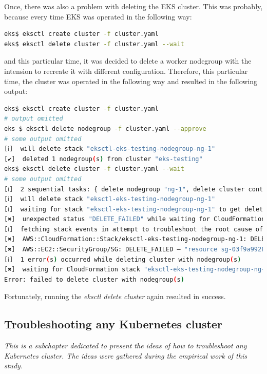 Once, there was also a problem with deleting the EKS cluster. This was probably, because every time EKS was operated in the following way:
\begin{lstlisting}[basicstyle=\tiny,caption={Deleting eksctl cluster},captionpos=b,language=Bash,xleftmargin=1cm]
eks$ eksctl create cluster -f cluster.yaml
eks$ eksctl delete cluster -f cluster.yaml --wait
\end{lstlisting}
and this particular time, it was decided to delete a worker nodegroup with the intension to recreate it with different configuration. Therefore, this particular time, the cluster was operated in the following way and resulted in the following output:
\begin{lstlisting}[basicstyle=\tiny,caption={Eksctl special operations},captionpos=b,language=Bash,xleftmargin=1cm]
eks$ eksctl create cluster -f cluster.yaml
# output omitted
eks $ eksctl delete nodegroup -f cluster.yaml --approve
# some output omitted
[ℹ]  will delete stack "eksctl-eks-testing-nodegroup-ng-1"
[✔]  deleted 1 nodegroup(s) from cluster "eks-testing"
eks$ eksctl delete cluster -f cluster.yaml --wait
# some output omitted
[ℹ]  2 sequential tasks: { delete nodegroup "ng-1", delete cluster control plane "eks-testing" }
[ℹ]  will delete stack "eksctl-eks-testing-nodegroup-ng-1"
[ℹ]  waiting for stack "eksctl-eks-testing-nodegroup-ng-1" to get deleted
[✖]  unexpected status "DELETE_FAILED" while waiting for CloudFormation stack "eksctl-eks-testing-nodegroup-ng-1"
[ℹ]  fetching stack events in attempt to troubleshoot the root cause of the failure
[✖]  AWS::CloudFormation::Stack/eksctl-eks-testing-nodegroup-ng-1: DELETE_FAILED – "The following resource(s) failed to delete: [SG]. "
[✖]  AWS::EC2::SecurityGroup/SG: DELETE_FAILED – "resource sg-03f9a9928f765ecae has a dependent object (Service: AmazonEC2; Status Code: 400; Error Code: DependencyViolation; Request ID: 682fd971-5ec7-472e-9eee-4d52a44f9455)"
[ℹ]  1 error(s) occurred while deleting cluster with nodegroup(s)
[✖]  waiting for CloudFormation stack "eksctl-eks-testing-nodegroup-ng-1": ResourceNotReady: failed waiting for successful resource state
Error: failed to delete cluster with nodegroup(s)
\end{lstlisting}
Fortunately, running the \textit{eksctl delete cluster} again resulted in success.

\subsection{Troubleshooting any Kubernetes cluster}
\textit{This is a subchapter dedicated to present the ideas of how to troubleshoot any Kubernetes cluster. The ideas were gathered during the empirical work of this study.}
\\

